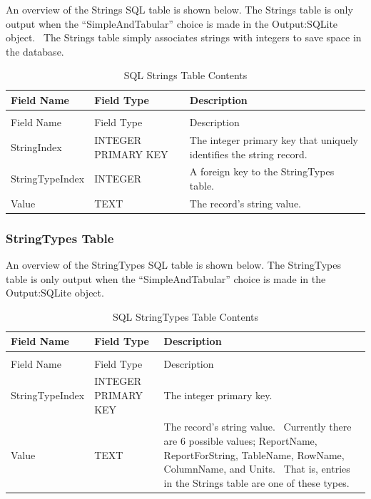 An overview of the Strings SQL table is shown below. The Strings table is only output when the “SimpleAndTabular” choice is made in the Output:SQLite object.  The Strings table simply associates strings with integers to save space in the database.

\begin{longtable}[c]{>{\raggedright}p{1.5in}>{\raggedright}p{1.5in}>{\raggedright}p{3in}}
\caption{SQL Strings Table Contents \label{table:table-39.-sql-strings-table-contents}} \tabularnewline
\toprule
Field Name & Field Type & Description \tabularnewline
\midrule
\endfirsthead

\caption[]{SQL Strings Table Contents} \tabularnewline
\toprule
Field Name & Field Type & Description \tabularnewline
\midrule
\endhead

StringIndex & INTEGER PRIMARY KEY & The integer primary key that uniquely identifies the string record. \tabularnewline
StringType\-Index & INTEGER & A foreign key to the StringTypes table. \tabularnewline
Value & TEXT & The record’s string value. \tabularnewline
\bottomrule
\end{longtable}

\subsubsection{StringTypes Table}

An overview of the StringTypes SQL table is shown below. The StringTypes table is only output when the “SimpleAndTabular” choice is made in the Output:SQLite object.

\begin{longtable}[c]{>{\raggedright}p{1.5in}>{\raggedright}p{1.5in}>{\raggedright}p{3in}}
\caption{SQL StringTypes Table Contents \label{table:table-40.-sql-stringtypes-table-contents}} \tabularnewline
\toprule
Field Name & Field Type & Description \tabularnewline
\midrule
\endfirsthead

\caption[]{SQL StringTypes Table Contents} \tabularnewline
\toprule
Field Name & Field Type & Description \tabularnewline
\midrule
\endhead

StringType\-Index & INTEGER PRIMARY KEY & The integer primary key. \tabularnewline
Value & TEXT & The record’s string value.~ Currently there are 6 possible values; ReportName, ReportForString, TableName, RowName, ColumnName, and Units.~ That is, entries in the Strings table are one of these types. \tabularnewline
\bottomrule
\end{longtable}

